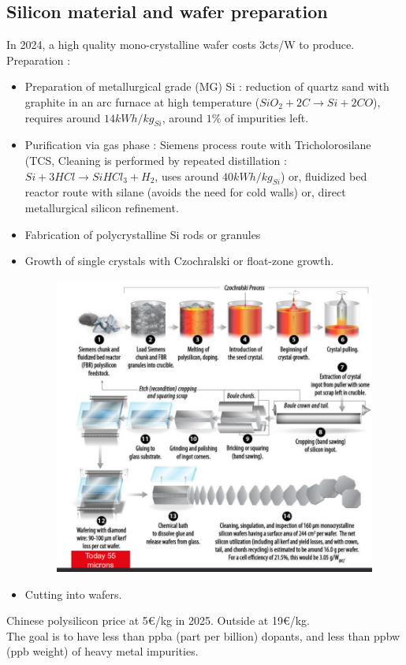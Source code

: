 \documentclass[../main.tex]{subfiles}
\begin{document}
\subsection{Silicon material and wafer preparation}
In 2024, a high quality mono-crystalline wafer costs 3cts/W to produce. \\
Preparation : 
\begin{itemize}
    \item Preparation of metallurgical grade (MG) Si : reduction of quartz sand with graphite in an arc furnace at high temperature ($SiO_2+2C \rightarrow Si+2CO$), requires around $14kWh/kg_{Si}$, around $1\%$ of impurities left.
    \item Purification via gas phase : Siemens process route with Tricholorosilane (TCS, Cleaning is performed by repeated distillation : $Si+3HCl \rightarrow SiHCl_3 + H_2$, uses around $40kWh/kg_{Si}$) or, fluidized bed reactor route with silane (avoids the need for cold walls) or, direct metallurgical silicon refinement.
    \item Fabrication of polycrystalline Si rods or granules
    \item Growth of single crystals with Czochralski or float-zone growth.
    \begin{figure}[hbt!]
        \centering
        \includegraphics[width=0.5\linewidth]{IMAGES/PV/Screenshot from 2025-04-29 13-56-31.png}
    \end{figure}
    
    \item Cutting into wafers.
\end{itemize}
Chinese polysilicon price at 5€/kg in 2025. Outside at 19€/kg.\\
The goal is to have less than ppba (part per billion) dopants, and less than ppbw (ppb weight) of heavy metal impurities.\\
\end{document}
